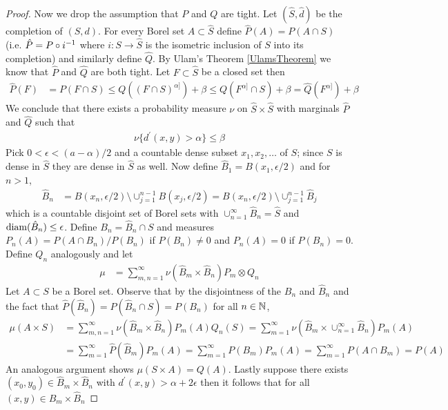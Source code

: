 \begin{proof}
Now we drop the assumption that $P$ and $Q$ are tight.  Let $(\hat{S}, \hat{d})$ be the completion of $(S,d)$.  For every Borel set $A \subset \hat{S}$ define $\hat{P}(A) = P(A \cap S)$ (i.e. $\hat{P} = \pushforward{i}{P}$ where $i : S \to \hat{S}$ is the isometric inclusion of $S$ into its completion)  and similarly define $\hat{Q}$.  By Ulam's Theorem \ref{UlamsTheorem} we know that $\hat{P}$ and $\hat{Q}$ are both tight.  Let $F \subset \hat{S}$ be a closed set then
\begin{align*}
\hat{P}(F) &= P(F \cap S) \leq Q((F \cap S)^{\alpha]}) + \beta \leq Q(F^{\alpha]} \cap S) + \beta = \hat{Q}(F^{\alpha]}) + \beta
\end{align*}
We conclude that there exists a probability measure $\nu$ on $\hat{S} \times \hat{S}$ with marginals $\hat{P}$ and $\hat{Q}$ such that 
\begin{align*}
\nu \lbrace d^\prime(x,y) > \alpha \rbrace \leq \beta
\end{align*}
Pick $0 < \epsilon < (a - \alpha)/2$ and a countable dense subset $x_1, x_2, \dotsc$ of $S$; since $S$ is dense in $\hat{S}$ they are dense in $\hat{S}$ as well.  Now define $\hat{B}_1 = B(x_1, \epsilon/2)$ and for $n > 1$,
\begin{align*}
\hat{B}_n &= B(x_n, \epsilon/2) \setminus \cup_{j=1}^{n-1}  B(x_j, \epsilon/2) = B(x_n, \epsilon/2) \setminus \cup_{j=1}^{n-1}  \hat{B}_j
\end{align*}
which is a countable disjoint set of Borel sets with $\cup_{n=1}^\infty \hat{B}_n = \hat{S}$ and $\diam(\hat{B}_n) \leq \epsilon$.  Define $B_n = \hat{B}_n \cap S$ and measures $P_n(A) = P(A \cap B_n) / P(B_n)$ if $P(B_n) \neq 0$ and $P_n(A) = 0$ if $P(B_n)=0$.  Define $Q_n$ analogously and let
\begin{align*}
\mu &= \sum_{m,n=1}^\infty \nu(\hat{B}_m \times \hat{B}_n) P_m \otimes Q_n
\end{align*}
Let $A \subset S$ be a Borel set.  Observe that by the disjointness of the $B_n$ and $\hat{B}_n$ and the fact that $\hat{P}(\hat{B}_n) = P(\hat{B}_n \cap S) = P(B_n)$ for all $n \in \naturals$,
\begin{align*}
\mu(A \times S) &= \sum_{m,n=1}^\infty \nu(\hat{B}_m \times \hat{B}_n) P_m (A)  Q_n(S) = \sum_{m=1}^\infty \nu(\hat{B}_m \times \cup_{n=1}^\infty \hat{B}_n) P_m (A) \\
&=\sum_{m=1}^\infty \hat{P}(\hat{B}_m) P_m (A)  = \sum_{m=1}^\infty P(B_m) P_m (A)  = \sum_{m=1}^\infty P(A \cap B_m) = P(A)
\end{align*}
An analogous argument shows $\mu(S \times A) = Q(A)$.  Lastly suppose there exists $(x_0,y_0) \in \hat{B}_m \times \hat{B}_n$ with $d^\prime(x,y) > \alpha + 2 \epsilon$ then it follows that for all $(x,y) \in \hat{B}_m \times \hat{B}_n$ 

\end{proof}

